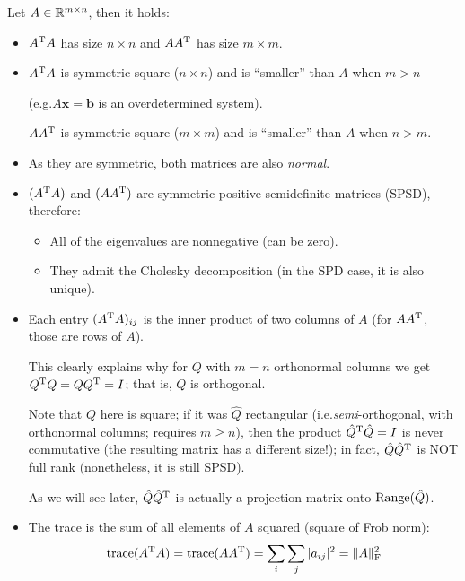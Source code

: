 \documentclass[
  12pt,
  paper=a4,
]{scrartcl} %
\begin{document}
Let $A\in \mathbb R^{m\times n}$, then it holds:
\begin{itemize}
    \item $A^{\mathrm{T}} A$ has size $n \times n$ and $AA^{\mathrm{T}}$ has size $m \times m$.

    \item {} $A^{\mathrm{T}} A$ is symmetric square ($n\times n$) and is ``smaller'' than $A$ when $m>n$
    
    (e.g.\@ $A\bm x=\bm b$ is an overdetermined system).
    
    $AA^{\mathrm{T}}$ is symmetric square ($m\times m$) and is ``smaller'' than $A$ when $n>m$.
    
    \item {} As they are symmetric, both matrices are also \emph{normal}.

    \item {}$(A^{\mathrm{T}} A)$ and $(A A^{\mathrm{T}} )$ are symmetric positive semidefinite matrices (SPSD), therefore:
    \begin{itemize}
        \item All of the eigenvalues are nonnegative (can be zero).
        \item They admit the Cholesky decomposition (in the SPD case, it is also unique).
    \end{itemize}

    \item Each entry $(A^{\mathrm{T}} A)_{ij}$ is the inner product of two columns of $A$ (for $AA^{\mathrm{T}}$, those are rows of $A$). 
    
    This clearly explains why for $Q$ with $m=n$ orthonormal columns we get $ Q^{\mathrm{T}} Q=QQ^{\mathrm{T}}=I$; that is, $Q$ is orthogonal.
    
    Note that $Q$ here is square; if it was $\hat Q$ rectangular (i.e.\@ \emph{semi}-orthogonal, with orthonormal columns; requires $m\ge n$), then the product $\hat Q^{\mathrm{T}} \hat Q = I$ is never commutative (the resulting matrix has a different size!); in fact, $\hat{Q}\hat{Q}^{\mathrm{T}}$ is NOT full rank (nonetheless, it is still SPSD).
    
    As we will see later, $\hat{Q}\hat{Q}^{\mathrm{T}}$ is actually a projection matrix onto $\operatorname{Range}(\hat Q)$.
    \item The trace is the sum of all elements of $A$ squared (square of Frob norm):
    \[ \operatorname{trace}(A^{\mathrm{T}} A) = \operatorname{trace}(A A^{\mathrm{T}}) = \sum_i\sum_j |a_{ij}|^2= \|A\|_{\text{F}}^2\]
    \vspace{-0.55cm}


\end{itemize}
\end{document}
